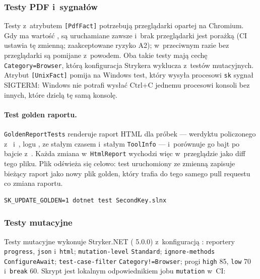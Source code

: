 \subsubsection{Testy PDF i~sygnałów}

Testy z~atrybutem \texttt{[PdfFact]} potrzebują przeglądarki opartej na Chromium. Gdy
 ma wartość , są uruchamiane zawsze i~brak
przeglądarki jest porażką (CI ustawia tę zmienną; zaakceptowane ryzyko A2); w~przeciwnym
razie bez przeglądarki są pomijane z~powodem. Oba takie testy mają cechę
\texttt{Category=Browser}, którą konfiguracja Strykera wyklucza z~testów mutacyjnych.
Atrybut \texttt{[UnixFact]} pomija na Windows test, który wysyła procesowi \texttt{sk} sygnał
SIGTERM: Windows nie potrafi wysłać Ctrl+C jednemu procesowi konsoli bez innych, które
dzielą tę samą konsolę.

\paragraph{Test golden raportu.} \texttt{GoldenReportTests} renderuje raport HTML dla
próbek --- werdyktu policzonego z~
i~, logu , ze stałym
czasem i~stałym \texttt{ToolInfo} --- i~porównuje go bajt po bajcie
z~. Każda zmiana
w~\texttt{HtmlReport} wychodzi więc w~przeglądzie jako diff tego pliku. Plik odświeża się
celowo: test uruchomiony ze zmienną  zapisuje bieżący
raport jako nowy plik golden, który trafia do tego samego pull requestu co zmiana raportu.

\begin{lstlisting}
SK_UPDATE_GOLDEN=1 dotnet test SecondKey.slnx
\end{lstlisting}

\subsubsection{Testy mutacyjne}

Testy mutacyjne wykonuje Stryker.NET ( 5.0.0) z~konfiguracją
: reportery \texttt{progress}, \texttt{json} i~\texttt{html};
\texttt{mutation-level} \texttt{Standard}; \texttt{ignore-methods} \texttt{ConfigureAwait};
\texttt{test-case-filter} \texttt{Category!=Browser}; progi \texttt{high} 85, \texttt{low}
70 i~\texttt{break} 60. 
Skrypt  jest lokalnym odpowiednikiem jobu \texttt{mutation} w~CI:

